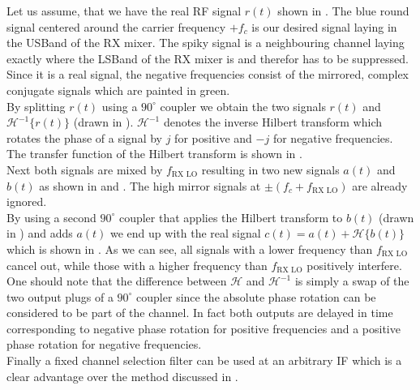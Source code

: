 Let us assume, that we have the real \gls{RF} signal $r(t)$ shown in
.
The blue round signal centered around the carrier frequency $+f_c$ is our
desired signal laying in the \gls{USBand} of the \gls{RX} mixer.
The spiky signal is a neighbouring channel laying exactly
where the \gls{LSBand} of the \gls{RX} mixer is and therefor has to
be suppressed.
Since it is a real signal, the negative frequencies consist of the mirrored,
complex conjugate signals which are painted in green. \\

By splitting $r(t)$ using a $90^\circ$ coupler we obtain the two signals
$r(t)$ and $\mathcal{H}^{-1}\{r(t)\}$ (drawn in ).
$\mathcal{H}^{-1}$ denotes the inverse Hilbert transform which rotates the phase
of a signal by $j$ for positive and $-j$ for negative frequencies.
The transfer function of the Hilbert transform is shown in
. \\

Next both signals are mixed by $f_{\text{RX LO}}$ resulting in two new signals
$a(t)$ and $b(t)$ as shown in  and
.
The high mirror signals at $\pm (f_c + f_{\text{RX LO}})$ are already
ignored. \\

By using a second $90^\circ$ coupler that applies the Hilbert transform
to $b(t)$ (drawn in )
and adds $a(t)$ we end up with the real signal
$c(t) = a(t) + \mathcal{H}\{b(t)\}$
which is shown in .
As we can see, all signals with a lower frequency than $f_{\text{RX LO}}$
cancel out, while those with a higher frequency than $f_{\text{RX LO}}$
positively interfere. \\

One should note that the difference between $\mathcal{H}$ and $\mathcal{H}^{-1}$
is simply a swap of the two output plugs of a $90^\circ$ coupler since
the absolute phase rotation can be considered to be part of the channel.
In fact both outputs are delayed in time corresponding to negative phase
rotation for positive frequencies and a positive phase rotation for negative
frequencies. \\

Finally a fixed channel selection filter can be used at an arbitrary \gls{IF}
which is a clear advantage over the method discussed in . \\

